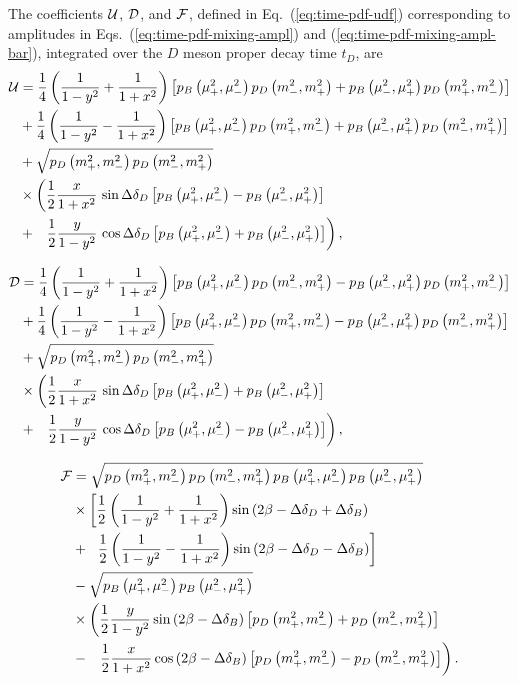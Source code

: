 \documentclass[a4paper,11pt]{article}
\begin{document}
The coefficients $\mathcal{U}$, $\mathcal{D}$, and $\mathcal{F}$, defined in 
Eq.~(\ref{eq:time-pdf-udf}) corresponding to amplitudes in 
Eqs.~(\ref{eq:time-pdf-mixing-ampl}) and (\ref{eq:time-pdf-mixing-ampl-bar}), 
integrated over the $D$ meson proper decay time $t_D$, are
\begin{equation}\label{eq:u_mixing_unbinned}
 \begin{split}
  \mathcal{U} &=
    \frac{1}{4}\left( \frac{1}{1-y^2} + \frac{1}{1 + x^2} \right)
       \left[p_B\left(\mu^2_{+},\mu^2_{-}\right) p_D\left(m_-^2,m_+^2\right) + p_B\left(\mu^2_{-},\mu^2_{+}\right) p_D\left(m_+^2,m_-^2\right) \right] \\
  &+\frac{1}{4}\left( \frac{1}{1-y^2} - \frac{1}{1 + x^2} \right)
       \left[p_B\left(\mu^2_{+},\mu^2_{-}\right) p_D\left(m_+^2,m_-^2\right)    + p_B\left(\mu^2_{-},\mu^2_{+}\right) p_D\left(m_-^2,m_+^2\right) \right] \\
  &+\sqrt{p_D\left(m_+^2,m_-^2\right) p_D\left(m_-^2,m_+^2\right)} \\ &\times
        \left(\frac{1}{2}\frac{x}{1 + x^2}\,\sin{\Delta\delta_D}
              \left[p_B\left(\mu^2_{+},\mu^2_{-}\right) - p_B\left(\mu^2_{-},\mu^2_{+}\right)\right] \right. \\
  &+\left.\ \ \frac{1}{2}\frac{y}{1 - y^2}\,\cos{\Delta\delta_D}
              \left[p_B\left(\mu^2_{+},\mu^2_{-}\right) + p_B\left(\mu^2_{-},\mu^2_{+}\right)\right]\right),
 \end{split}
\end{equation}

\begin{equation}\label{eq:c_mixing_unbinned}
 \begin{split}
  \mathcal{D} &=
    \frac{1}{4}\left( \frac{1}{1-y^2} + \frac{1}{1 + x^2} \right)
       \left[p_B\left(\mu^2_{+},\mu^2_{-}\right) p_D\left(m_-^2,m_+^2\right) - p_B\left(\mu^2_{-},\mu^2_{+}\right) p_D\left(m_+^2,m_-^2\right) \right] \\
  &+\frac{1}{4}\left( \frac{1}{1-y^2} - \frac{1}{1 + x^2} \right)
       \left[p_B\left(\mu^2_{+},\mu^2_{-}\right) p_D\left(m_+^2,m_-^2\right)    - p_B\left(\mu^2_{-},\mu^2_{+}\right) p_D\left(m_-^2,m_+^2\right) \right] \\
  &+\sqrt{p_D\left(m_+^2,m_-^2\right) p_D\left(m_-^2,m_+^2\right)} \\ &\times
        \left(\frac{1}{2}\frac{x}{1 + x^2}\,\sin{\Delta\delta_D}
        \left[p_B\left(\mu^2_{+},\mu^2_{-}\right) + p_B\left(\mu^2_{-},\mu^2_{+}\right)\right] \right. \\
  &+\left.\ \ \frac{1}{2}\frac{y}{1 - y^2}\,\cos{\Delta\delta_D}
        \left[p_B\left(\mu^2_{+},\mu^2_{-}\right) - p_B\left(\mu^2_{-},\mu^2_{+}\right)\right]\right),
 \end{split}
\end{equation}

\begin{equation}\label{eq:s_mixing_unbinned}
 \begin{split}
  \mathcal{F} &=
  \sqrt{p_D\left(m_+^2,m_-^2\right) p_D\left(m_-^2,m_+^2\right) p_B\left(\mu^2_{+},\mu^2_{-}\right) p_B\left(\mu^2_{-},\mu^2_{+}\right)} \\
  &\times \left[\frac{1}{2}\left( \frac{1}{1-y^2} + 
      \frac{1}{1 + x^2} \right)\sin{\left(2\beta- \Delta\delta_D+ \Delta\delta_{B}\right)}\right. \\
  &+\,\left.\ \frac{1}{2}\left( \frac{1}{1-y^2} -
      \frac{1}{1 + x^2} \right)\sin{\left(2\beta- \Delta\delta_D- \Delta\delta_{B}\right)}\right] \\
  &-\sqrt{p_B\left(\mu^2_{+},\mu^2_{-}\right) p_B\left(\mu^2_{-},\mu^2_{+}\right)} \\ &\times
        \left(\frac{1}{2}\frac{y}{1 - y^2}\sin{\left(2\beta- \Delta\delta_{B}\right)}
        \left[p_D\left(m_+^2,m_-^2\right) + p_D\left(m_-^2,m_+^2\right)\right] \right. \\
  &-\left.\ \ \frac{1}{2}\frac{x}{1 + x^2}\cos{\left(2\beta- \Delta\delta_{B}\right)}
        \left[p_D\left(m_+^2,m_-^2\right) - p_D\left(m_-^2,m_+^2\right)\right]\right).
 \end{split}
\end{equation}
\end{document}
